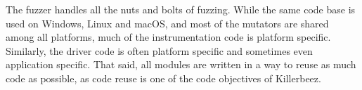 
The fuzzer handles all the nuts and bolts of fuzzing. While the same code base
is used on Windows, Linux and macOS, and most of the mutators are shared among
all platforms, much of the instrumentation code is platform specific.
Similarly, the driver code is often platform specific and sometimes even
application specific. That said, all modules are written in a way to reuse as
much code as possible, as code reuse is one of the code objectives of
Killerbeez.
